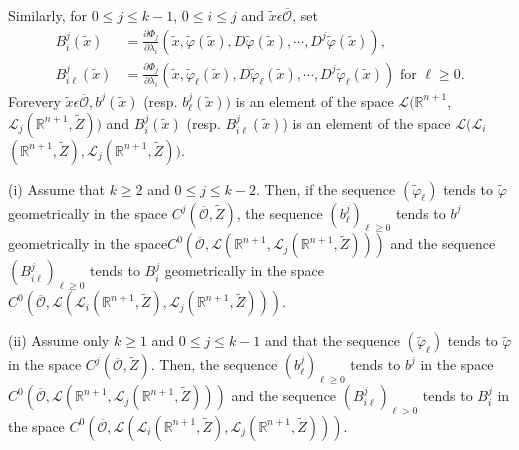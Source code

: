 Similarly, for $0 \leq j \leq k-1$, $0 \leq i \leq j$ and
$\widetilde{x} \epsilon \overline{\mathscr{O}}$, set
\begin{align*}
B_{i}^{j}(\widetilde{x}) & = \frac{\partial \Phi_{j}}{\partial
  \lambda_{i}} (\widetilde{x}, \widetilde{\varphi}(\widetilde{x}),
D\widetilde{\varphi}(\widetilde{x}), \cdots,
D^{j}\widetilde{\varphi}(\widetilde{x})),\tag{A2.38}\label{app-2-eqA2.38}\\
B_{i \ell}^{j}(\widetilde{x}) & = \frac{\partial \Phi_{j}}{\partial
  \lambda_{i}} (\widetilde{x}, \widetilde{\varphi}_{\ell}
(\widetilde{x}), D\widetilde{\varphi}_{\ell}(\widetilde{x}), \cdots,
D^{j}\widetilde{\varphi}_{\ell}(\widetilde{x})) \text{ for } \ell \geq
0.\tag{A2.39} \label{app-2-eqA2.39}
\end{align*}
For\pageoriginale every $\widetilde{x} \epsilon
\overline{\mathscr{O}}, b^{j}(\widetilde{x})$
(resp. $b_{\ell}^{j}(\widetilde{x}))$ is an element of the space
$\mathscr{L} (\mathbb{R}^{n+1}$, $\mathscr{L}_{j} (\mathbb{R}^{n+1},
\widetilde{Z}))$ and $B_{i}^{j}(\widetilde{x})$ (resp. $B_{i \ell}^{j}
(\widetilde{x})$) is an element of the space
$\mathscr{L}(\mathscr{L}_{i} $ $ (\mathbb{R}^{n+1}, \widetilde{Z}),
\mathscr{L}_{j} (\mathbb{R}^{n + 1}, \widetilde{Z}))$.

\begin{alphlemma}\label{app-2-lemA2.6}%
(i) Assume that $k \geq 2$ and $0 \leq j \leq k-2$. Then, if the
  sequence $(\widetilde{\varphi}_{\ell})$ tends to
  $\widetilde{\varphi}$ geometrically in the space
  $C^{j}(\overline{\mathscr{O}}, \widetilde{Z})$, the sequence
  $(b_{\ell}^{j})_{\ell \geq 0}$ tends to $b^{j}$ geometrically in the
  space\break $C^{0}(\overline{\mathscr{O}}, \mathscr{L}(\mathbb{R}^{n+1},
  \mathscr{L}_{j}(\mathbb{R}^{n+1},  \widetilde{Z})))$ and the
  sequence $(B_{i\ell}^{j})_{\ell \geq 0}$ tends to $B_{i}^{j}$
  geometrically in the space $C^{0}(\overline{\mathscr{O}},
  \mathscr{L}(\mathscr{L}_{i}(\mathbb{R}^{n+1},  \widetilde{Z}),
  \mathscr{L}_{j}(\mathbb{R}^{n+1},  \widetilde{Z})))$.

(ii) Assume only $k \geq 1$ and $0 \leq j \leq k - 1$ and that the
  sequence $( \widetilde{\varphi}_{\ell})$ tends to $
  \widetilde{\varphi}$ in the space $C^{j}(\overline{\mathscr{O}},
  \widetilde{Z})$. Then, the sequence $(b_{\ell}^{j})_{\ell \geq 0}$
  tends to $b^{j}$ in the space $C^{0}(\overline{\mathscr{O}},
  \mathscr{L}(\mathbb{R}^{n+1}, \mathscr{L}_{j} (\mathbb{R}^{n+1},
  \widetilde{Z})))$ and the sequence $(B_{i\ell}^{j})_{\ell > 0}$
  tends to $B_{i}^{j}$ in the space $C^{0}(\overline{\mathscr{O}},
  \mathscr{L}(\mathscr{L}_{i}(\mathbb{R}^{n+1},  \widetilde{Z}),
  \mathscr{L}_{j} (\mathbb{R}^{n+1},  \widetilde{Z})))$.
  \end{alphlemma}

